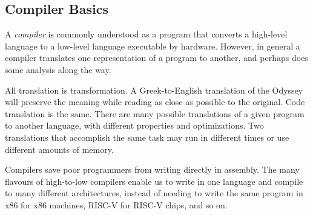 \subsection{Compiler Basics}

A \emph{compiler} is commonly understood as a program that converts a high-level language to a low-level language executable by hardware.
However, in general a compiler translates one representation of a program to another, and perhaps does some analysis along the way. 

All translation is transformation. A Greek-to-English 
translation of the Odyssey will preserve the meaning
while reading as close as possible to the original. Code translation is 
the same. There are many possible translations of a given program 
to another language, with different properties and optimizations. 
Two translations that accomplish the same task may run in different times or
use different amounts of memory. 

Compilers save poor programmers from writing directly in assembly.
The many flavours of high-to-low compilers enable us to write in one language and compile 
to many different architectures, instead of needing to write 
the same program in x86 for x86 machines, RISC-V for RISC-V chips, and so on. 


